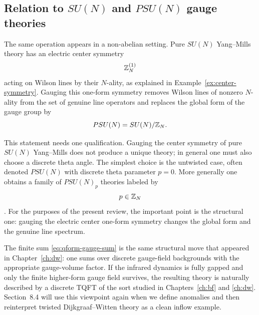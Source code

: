 \subsection{Relation to \texorpdfstring{$SU(N)$}{SU(N)} and \texorpdfstring{$PSU(N)$}{PSU(N)} gauge theories}

The same operation appears in a non-abelian setting. Pure $SU(N)$ Yang--Mills theory has an electric center symmetry
\begin{equation*}
\mathbb{Z}_N^{(1)}
\end{equation*}
acting on Wilson lines by their $N$-ality, as explained in Example~\ref{ex:center-symmetry}. Gauging this one-form symmetry removes Wilson lines of nonzero $N$-ality from the set of genuine line operators and replaces the global form of the gauge group by
\begin{equation*}
PSU(N)=SU(N)/\mathbb{Z}_N.
\end{equation*}

\begin{remark}\label{rem:psun-discrete-theta}
This statement needs one qualification. Gauging the center symmetry of pure $SU(N)$ Yang--Mills does not produce a unique theory; in general one must also choose a discrete theta angle. The simplest choice is the untwisted case, often denoted $PSU(N)$ with discrete theta parameter $p=0$. More generally one obtains a family of $PSU(N)_p$ theories labeled by
\begin{equation*}
p\in \mathbb{Z}_N
\end{equation*}
\cite{AharonySeibergTachikawa2013}. For the purposes of the present review, the important point is the structural one: gauging the electric center one-form symmetry changes the global form and the genuine line spectrum.
\end{remark}

\begin{remark}\label{rem:qform-to-dw}
The finite sum \eqref{eq:qform-gauge-sum} is the same structural move that appeared in Chapter~\ref{ch:dw}: one sums over discrete gauge-field backgrounds with the appropriate gauge-volume factor. If the infrared dynamics is fully gapped and only the finite higher-form gauge field survives, the resulting theory is naturally described by a discrete TQFT of the sort studied in Chapters~\ref{ch:bf} and \ref{ch:dw}. Section~8.4 will use this viewpoint again when we define anomalies and then reinterpret twisted Dijkgraaf--Witten theory as a clean inflow example.
\end{remark}

